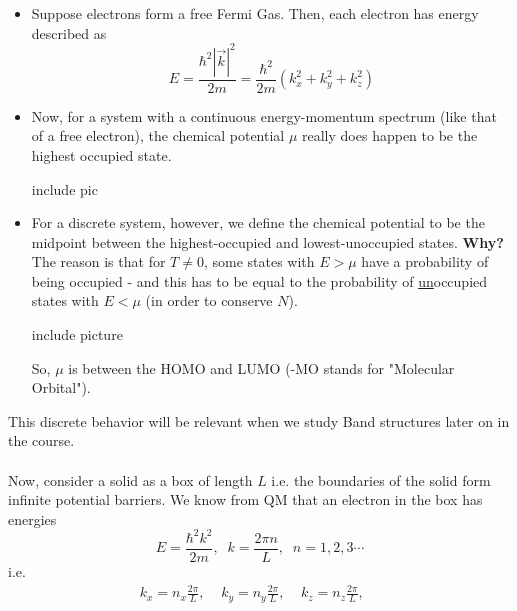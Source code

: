 \documentclass[11pt]{article}
\begin{document}
\begin{itemize}
  \item Suppose electrons form a free Fermi Gas. Then, each electron has energy described as $$ E = \frac{\hbar^2 |\vec{k}|^2}{2m} = \frac{\hbar^2}{2m} \left( k_x^2 + k_y^2 + k_z^2  \right) $$
  \item Now, for a system with a continuous energy-momentum spectrum (like that of a free electron), the chemical potential $\mu$ really does happen to be the highest occupied state.
  \begin{center}
    include pic
  \end{center}
  \item For a discrete system, however, we define the chemical potential to be the midpoint between the highest-occupied and lowest-unoccupied states. \textbf{Why?} The reason is that for $T \neq 0$, some states with $E > \mu$ have a probability of being occupied - and this has to be equal to the probability of \underline{un}occupied states with $E < \mu$ (in order to conserve $N$).
  \begin{center}
    include picture
  \end{center}
  So, $\mu$ is between the HOMO and LUMO (-MO stands for "Molecular Orbital").
\end{itemize} This discrete behavior will be relevant when we study Band structures later on in the course. 
\\
\\
Now, consider a solid as a box of length $L$ i.e. the boundaries of the solid form infinite potential barriers. We know from QM that an electron in the box has energies $$ E = \frac{\hbar^2 k^2}{2m},\;\;k = \frac{2\pi n}{L},\;\;n = 1,2,3 \cdots$$ i.e. 
\begin{align*}
  k_x = n_x \frac{2\pi}{L}, \;\;\;\; k_y = n_y \frac{2\pi}{L}, \;\;\;\; k_z = n_z \frac{2\pi}{L}, \;\;\;\;
\end{align*} 
\end{document}
